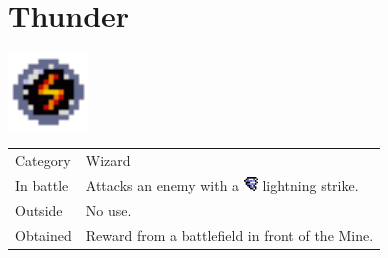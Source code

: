 \section{Thunder}
\label{spell:thunder}

\includegraphics[height=2cm,keepaspectratio]{./resources/spells/thunder}

\begin{longtable}{ l p{9cm} }
	Category
	& Wizard
\\ %
	In battle
	& Attacks an enemy with a \includegraphics[height=1em,keepaspectratio]{./resources/effects/wind} lightning strike.
\\ %
	Outside
	& No use.
\\ %
	Obtained
	& Reward from a battlefield in front of the Mine.
\end{longtable}
